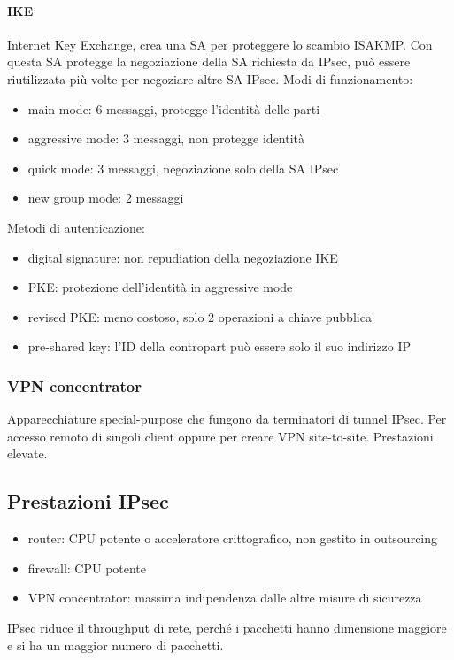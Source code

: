 \documentclass[11pt]{article}
\begin{document}
\paragraph*{IKE}
Internet Key Exchange, crea una SA per proteggere lo scambio ISAKMP. Con questa SA protegge la negoziazione della SA richiesta 
da IPsec, può essere riutilizzata più volte per negoziare altre SA IPsec.
Modi di funzionamento:
\begin{itemize}
    \item main mode: 6 messaggi, protegge l'identità delle parti 
    \item aggressive mode: 3 messaggi, non protegge identità
    \item quick mode: 3 messaggi, negoziazione solo della SA IPsec 
    \item new group mode: 2 messaggi 
\end{itemize}
Metodi di autenticazione: 
\begin{itemize}
    \item digital signature: non repudiation della negoziazione IKE 
    \item PKE: protezione dell'identità in aggressive mode 
    \item revised PKE: meno costoso, solo 2 operazioni a chiave pubblica 
    \item pre-shared key: l'ID della contropart può essere solo il suo indirizzo IP 
\end{itemize}
\subsubsection{VPN concentrator}
Apparecchiature special-purpose che fungono da terminatori di tunnel IPsec. Per accesso remoto di singoli client oppure 
per creare VPN site-to-site. Prestazioni elevate.
\subsection{Prestazioni IPsec}
\begin{itemize}
    \item router: CPU potente o acceleratore crittografico, non gestito in outsourcing 
    \item firewall: CPU potente 
    \item VPN concentrator: massima indipendenza dalle altre misure di sicurezza 
\end{itemize}
IPsec riduce il throughput di rete, perché i pacchetti hanno dimensione maggiore e si ha un maggior numero di pacchetti.
\end{document}
